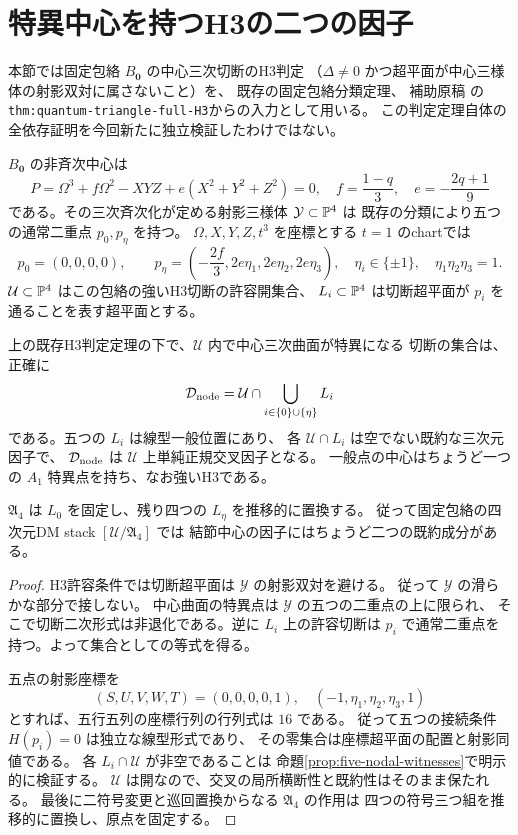 \section{特異中心を持つH3の二つの因子}
\label{sec:nodal-centers}
本節では固定包絡 $B_{\mathbf0}$ の中心三次切断のH3判定
（$\Delta\ne0$ かつ超平面が中心三様体の射影双対に属さないこと）を、
既存の固定包絡分類定理\cite{Repo}、
補助原稿 の
\texttt{thm:quantum-triangle-full-H3}からの入力として用いる。
この判定定理自体の全依存証明を今回新たに独立検証したわけではない。

$B_{\mathbf0}$ の非斉次中心は
\[
P=\Omega^3+f\Omega^2-XYZ+e(X^2+Y^2+Z^2)=0,
\quad f=\frac{1-q}{3},\quad e=-\frac{2q+1}{9}
\]
である。その三次斉次化が定める射影三様体 $\mathcal Y\subset\mathbb P^4$ は
既存の分類により五つの通常二重点 $p_0,p_\eta$ を持つ。
$\Omega,X,Y,Z,t^3$ を座標とする $t=1$ のchartでは
\[
p_0=(0,0,0,0),\qquad
p_\eta=\left(-\frac{2f}{3},2e\eta_1,2e\eta_2,2e\eta_3\right),
\quad \eta_i\in\{\pm1\},\quad\eta_1\eta_2\eta_3=1.
\]
$\mathcal U\subset\mathbb P^4$ はこの包絡の強いH3切断の許容開集合、
$L_i\subset\mathbb P^4$ は切断超平面が $p_i$ を通ることを表す超平面とする。

\begin{theorem}
\label{thm:nodal-divisors}
上の既存H3判定定理の下で、$\mathcal U$ 内で中心三次曲面が特異になる
切断の集合は、正確に
\[
 \mathcal D_{\rm node}=\mathcal U\cap\bigcup_{i\in\{0\}\cup\{\eta\}}L_i
\]
である。五つの $L_i$ は線型一般位置にあり、
各 $\mathcal U\cap L_i$ は空でない既約な三次元因子で、
$\mathcal D_{\rm node}$ は $\mathcal U$ 上単純正規交叉因子となる。
一般点の中心はちょうど一つの $A_1$ 特異点を持ち、なお強いH3である。

$\mathfrak A_4$ は $L_0$ を固定し、残り四つの $L_\eta$ を推移的に置換する。
従って固定包絡の四次元DM stack $[\mathcal U/\mathfrak A_4]$ では
結節中心の因子にはちょうど二つの既約成分がある。
\end{theorem}
\begin{proof}
H3許容条件では切断超平面は $\mathcal Y$ の射影双対を避ける。
従って $\mathcal Y$ の滑らかな部分で接しない。
中心曲面の特異点は $\mathcal Y$ の五つの二重点の上に限られ、
そこで切断二次形式は非退化である。逆に $L_i$ 上の許容切断は
$p_i$ で通常二重点を持つ。よって集合としての等式を得る。

五点の射影座標を
\[
 (S,U,V,W,T)= (0,0,0,0,1),\quad
 (-1,\eta_1,\eta_2,\eta_3,1)
\]
とすれば、五行五列の座標行列の行列式は $16$ である。
従って五つの接続条件 $H(p_i)=0$ は独立な線型形式であり、
その零集合は座標超平面の配置と射影同値である。
各 $L_i\cap\mathcal U$ が非空であることは
命題\ref{prop:five-nodal-witnesses}で明示的に検証する。
$\mathcal U$ は開なので、交叉の局所横断性と既約性はそのまま保たれる。
最後に二符号変更と巡回置換からなる $\mathfrak A_4$ の作用は
四つの符号三つ組を推移的に置換し、原点を固定する。
\end{proof}

